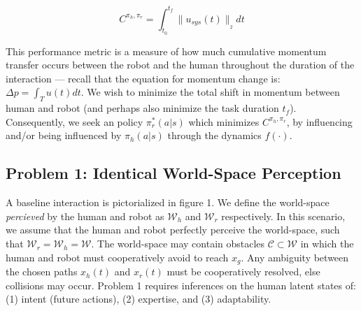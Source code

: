 \documentclass[conference]{IEEEtran}
\begin{document}
\begin{equation}
C^{\pi_h,\pi_r} = \int_{t_0}^{t_f} \lVert u_{sys}(t)\rVert_{_2}  dt
\end{equation}

This performance metric is a measure of how much cumulative momentum transfer occurs between the robot and the human throughout the duration of the interaction --- recall that the equation for momentum change is: $\Delta p = \int_T u(t)dt$. We wish to minimize the total shift in momentum between human and robot (and perhaps also minimize the task duration $t_f$). Consequently, we seek an policy $\pi_r^*(a|s)$ which minimizes $C^{\pi_h,\pi_r}$, by influencing and/or being influenced by $\pi_h(a|s)$ through the dynamics $f(\cdot)$.

\hspace{5mm}
\subsection{Problem 1: Identical World-Space Perception}
\hspace{5mm}

A baseline interaction is pictorialized in figure 1. We define the world-space \textit{percieved} by the human and robot as $\mathcal{W}_h$ and $\mathcal{W}_r$ respectively. In this scenario, we assume that the human and robot perfectly perceive the world-space, such that  $ \mathcal{W}_r = \mathcal{W}_h = \mathcal{W}$. The world-space may contain obstacles $\mathcal{C} \subset \mathcal{W}$ in which the human and robot must cooperatively avoid to reach $x_g$. Any ambiguity between the chosen paths $x_h(t)$ and $x_r(t)$ must be cooperatively resolved, else collisions may occur. Problem 1 requires inferences on the human latent states of: (1) intent (future actions), (2) expertise, and (3) adaptability. 
\end{document}
